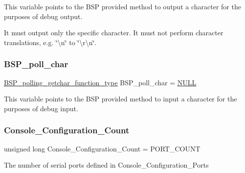 This variable points to the B\+SP provided method to output a character for the purposes of debug output.

It must output only the specific character. It must not perform character translations, e.\+g. \char`\"{}\textbackslash{}n\char`\"{} to \char`\"{}\textbackslash{}r\textbackslash{}n\char`\"{}. \mbox{\label{or1k_2generic__or1k_2console_2console-config_8c_ae5846eecdfa8f2813504371bf01c29b0}} 
\subsubsection{\texorpdfstring{BSP\_poll\_char}{BSP\_poll\_char}}
{\footnotesize\ttfamily \mbox{\hyperlink{bspIo_8h_a132b9ceff428a634ece5dfaac7ef1006}{B\+S\+P\+\_\+polling\+\_\+getchar\+\_\+function\+\_\+type}} B\+S\+P\+\_\+poll\+\_\+char = \mbox{\hyperlink{bestcomm__api_8h_a872bb74de61c3689ccd5b41873fce42c}{N\+U\+LL}}}

This variable points to the B\+SP provided method to input a character for the purposes of debug input. \mbox{\label{or1k_2generic__or1k_2console_2console-config_8c_a59f0ae8f9904bd193825ccfc2c99aeb6}} 
\subsubsection{\texorpdfstring{Console\_Configuration\_Count}{Console\_Configuration\_Count}}
{\footnotesize\ttfamily unsigned long Console\+\_\+\+Configuration\+\_\+\+Count = P\+O\+R\+T\+\_\+\+C\+O\+U\+NT}

The number of serial ports defined in Console\+\_\+\+Configuration\+\_\+\+Ports \mbox{\label{or1k_2generic__or1k_2console_2console-config_8c_a8d1404b49209c3692a3dc1433710e550}} 
